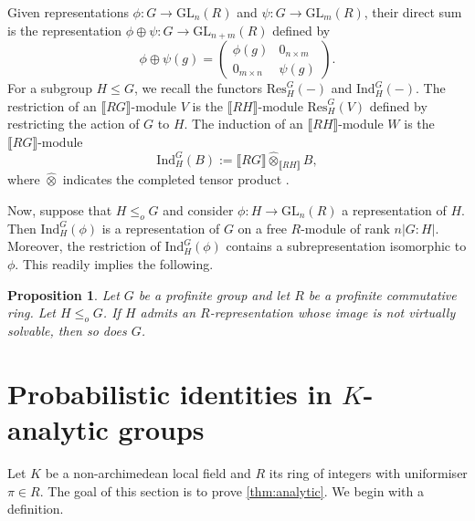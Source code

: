 \documentclass[a4paper,10pt]{amsart}
\theoremstyle{plain}
\newtheorem{proposition}[thm]{Proposition}
\theoremstyle{definition}
\numberwithin{equation}{section}
\begin{document}
	Given representations $\phi\colon G\to \mathrm{GL}_n(R)$ and $\psi\colon G\to \mathrm{GL}_m(R)$, their direct sum is the representation $\phi\oplus\psi\colon G\to \mathrm{GL}_{n+m}(R)$ defined by \[ \phi\oplus\psi(g)=\begin{pmatrix}
		\phi(g) & 0_{n\times m} \\
		0_{m\times n} & \psi(g)
	\end{pmatrix}. \]
	For a subgroup $H\leq G$, we recall the functors $\mathrm{Res}_H^G(-)$ and $\mathrm{Ind}_H^G(-)$. The restriction of an $\llbracket RG \rrbracket$-module $V$ is the $\llbracket RH \rrbracket$-module $\mathrm{Res}_H^G(V)$ defined by restricting the action of $G$ to $H$. The induction of an  $\llbracket RH \rrbracket$-module $W$ is the $\llbracket RG \rrbracket$-module \[ \mathrm{Ind}_H^G(B):= \llbracket RG\rrbracket\hat\otimes_{\llbracket RH \rrbracket}B, \] where $\hat\otimes$ indicates the completed tensor product \cite[Section 5.5]{RZ10}.
    
	Now, suppose that $H\leq_oG$ and consider $\phi\colon H\to \mathrm{GL}_n(R)$ a representation of $H$. Then 
    $\mathrm{Ind}_H^G(\phi)$ is a representation of $G$ on a free $R$-module of rank $n|G:H|$. 
    Moreover, the restriction of $\mathrm{Ind}_H^G(\phi)$ contains a subrepresentation isomorphic to $\phi$. This readily implies the following. 
	\begin{proposition}\label{inducedrepresentationlemma}
		Let $G$ be a profinite group and let $R$ be a profinite commutative ring. Let $H\leq_oG$. If $H$ admits an $R$-representation whose image is not virtually solvable, then so does $G$.
	\end{proposition}

\section{Probabilistic identities in \texorpdfstring{$K$}{K}-analytic groups}

Let $K$ be a non-archimedean local field and $R$ its ring of integers with uniformiser $\pi \in R$. The goal of this section is to prove \cref{thm:analytic}. We begin with a definition.
\end{document}
